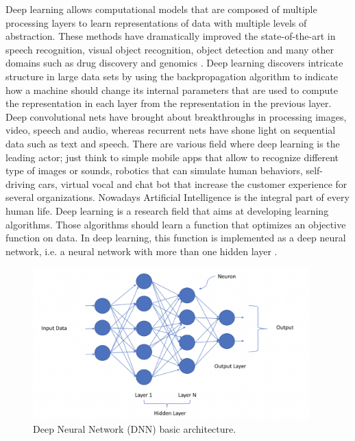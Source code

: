 \documentclass[english, LaM, oneside]{sapthesis}%
\begin{document}
Deep learning allows computational models that are composed of multiple processing layers to learn representations of data with multiple levels of abstraction. These methods have dramatically improved the state-of-the-art in speech recognition, visual object recognition, object detection and many other domains such as drug discovery and genomics \cite{deep-learning}. Deep learning discovers intricate structure in large data sets by using the backpropagation algorithm to indicate how a machine should change its internal parameters that are used to compute the representation in each layer from the representation in the previous layer. Deep convolutional nets have brought about breakthroughs in processing images, video, speech and audio, whereas recurrent nets have shone light on sequential data such as text and speech.
\newline \newline
There are various field where deep learning is the leading actor; just think to simple mobile apps that allow to recognize different type of images or sounds, robotics that can simulate human behaviors, self-driving cars, virtual vocal and chat bot that increase the customer experience for several organizations. Nowadays Artificial Intelligence is the integral part of every human life.
\newline \newline
Deep learning is a research field that aims at developing learning algorithms. Those algorithms should learn a function that optimizes an objective function on data. In deep learning, this function is implemented as a deep neural network, i.e. a neural network with more than one hidden layer \cite{neural-network}.
\begin{figure}[!h]
            \centering
            \includegraphics[width=0.95\textwidth]{DNN.png}
            \caption{Deep Neural Network (DNN) basic architecture.}
            \label{fig:dnn}
        \end{figure}
        
\end{document}
